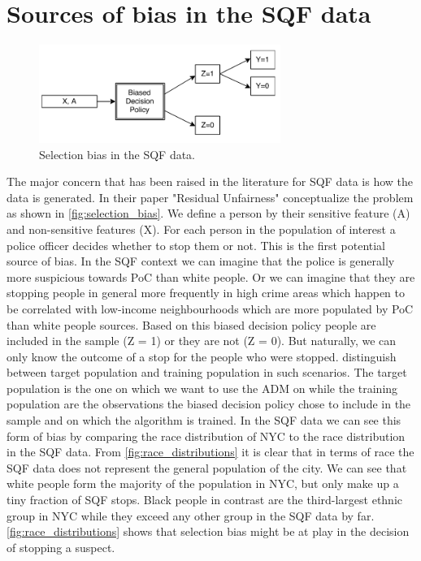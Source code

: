 \section*{Sources of bias in the SQF data}
\begin{figure}
    \includegraphics[width=0.7\textwidth]{../figures/selection_bias.png}
    \caption{Selection bias in the SQF data.}
    \label{fig:selection_bias}
\end{figure}
The major concern that has been raised in the literature for SQF data is how the data is generated. In their paper "Residual Unfairness" \cite{kallus2018} conceptualize the problem as shown in \autoref{fig:selection_bias}.
We define a person by their sensitive feature (A) and non-sensitive features (X). For each person in the population of interest a police officer decides whether to stop them or not. This is the first potential source of bias. In the SQF context we can imagine that the police is generally more suspicious towards PoC than white people. Or we can imagine that they are stopping people in general more frequently in high crime areas which happen to be correlated with low-income neighbourhoods which are more populated by PoC than white people {\color{red}sources}. Based on this biased decision policy people are included in the sample (Z = 1) or they are not (Z = 0). But naturally, we can only know the outcome of a stop for the people who were stopped.
\cite{kallus2018} distinguish between target population and training population in such scenarios. The target population is the one on which we want to use the ADM on while the training population are the observations the biased decision policy chose to include in the sample and on which the algorithm is trained.
In the SQF data we can see this form of bias by comparing the race distribution of NYC to the race distribution in the SQF data. From \autoref{fig:race_distributions} it is clear that in terms of race the SQF data does not represent the general population of the city. We can see that white people form the majority of the population in NYC, but only make up a tiny fraction of SQF stops. Black people in contrast are the third-largest ethnic group in NYC while they exceed any other group in the SQF data by far.
\autoref{fig:race_distributions} shows that selection bias might be at play in the decision of stopping a suspect.


